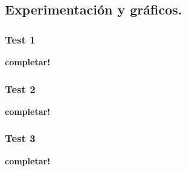 \newpage
\subsection{Experimentación y gráficos.}

\vspace*{0.3cm}

\subsubsection{Test 1}

\vspace*{0.3cm}

\textbf{completar!}


\newpage
\subsubsection{Test 2}

\vspace*{0.3cm}

\textbf{completar!}


\newpage
\subsubsection{Test 3}

\vspace*{0.3cm}

\textbf{completar!}
